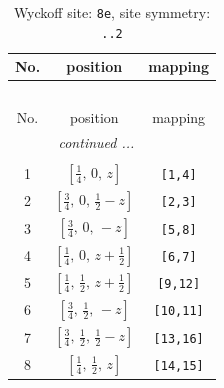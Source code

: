 \documentclass[fleqn,8pt]{jsarticle}
\begin{document}
\begin{longtable}{ccc}
\caption{Wyckoff site: {\tt 8e}, site symmetry: {\tt ..2}}
 \\
 \hline \hline
No. & position & mapping \\ \hline \endfirsthead

\multicolumn{2}{l}{\tablename\ \thetable{}} \\
 \hline \hline
No. & position & mapping \\ \hline \endhead

 \hline \hline
\multicolumn{2}{r}{\footnotesize\it continued ...} \\ \endfoot

 \hline \hline
\multicolumn{2}{r}{} \\ \endlastfoot

1 & $\left[ \frac{1}{4},\, 0,\, z \right]$ & {\tt [1,4]} \\ \hline
2 & $\left[ \frac{3}{4},\, 0,\, \frac{1}{2} - z \right]$ & {\tt [2,3]} \\ \hline
3 & $\left[ \frac{3}{4},\, 0,\, - z \right]$ & {\tt [5,8]} \\ \hline
4 & $\left[ \frac{1}{4},\, 0,\, z + \frac{1}{2} \right]$ & {\tt [6,7]} \\ \hline
5 & $\left[ \frac{1}{4},\, \frac{1}{2},\, z + \frac{1}{2} \right]$ & {\tt [9,12]} \\ \hline
6 & $\left[ \frac{3}{4},\, \frac{1}{2},\, - z \right]$ & {\tt [10,11]} \\ \hline
7 & $\left[ \frac{3}{4},\, \frac{1}{2},\, \frac{1}{2} - z \right]$ & {\tt [13,16]} \\ \hline
8 & $\left[ \frac{1}{4},\, \frac{1}{2},\, z \right]$ & {\tt [14,15]} \\
\end{longtable}
\renewcommand{\arraystretch}{1.2}
\end{document}
